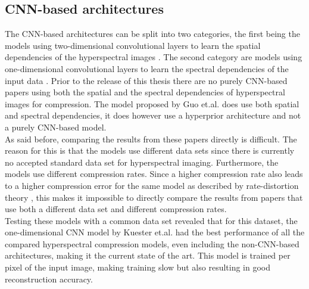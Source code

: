 \subsection{CNN-based architectures}
The CNN-based architectures can be split into two categories, the first being the models using two-dimensional convolutional layers to learn the spatial dependencies of the hyperspectral images \citep{la_grassa_hyperspectral_2022}. The second category are models using one-dimensional convolutional layers to learn the spectral dependencies of the input data \citep{kuester_1d-convolutional_2021}\citep{kuester_transferability_2022}. Prior to the release of this thesis there are no purely CNN-based papers using both the spatial and the spectral dependencies of hyperspectral images for compression. The model proposed by Guo et.al. \citep{guo_learned_2021} does use both spatial and spectral dependencies, it does however use a hyperprior architecture and not a purely CNN-based model.\\
As said before, comparing the results from these papers directly is difficult. The reason for this is that the models use different data sets since there is currently no accepted standard data set for hyperspectral imaging. Furthermore, the models use different compression rates. Since a higher compression rate also leads to a higher compression error for the same model as described by rate-distortion theory \citep{berger_rate-distortion_2003}, this makes it impossible to directly compare the results from papers that use both a different data set and different compression rates.\\
Testing these models with a common data set revealed that for this dataset, the one-dimensional CNN model by Kuester et.al. \citep{kuester_1d-convolutional_2021} had the best performance of all the compared hyperspectral compression models, even including the non-CNN-based architectures, making it the current state of the art. This model is trained per pixel of the input image, making training slow but also resulting in good reconstruction accuracy.
